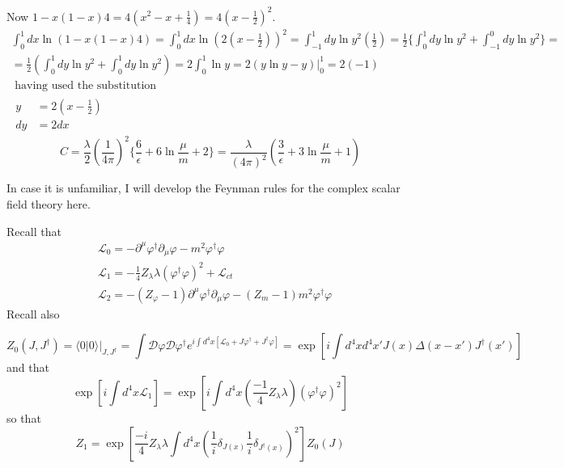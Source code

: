 \documentclass[twoside]{amsart}
\newcommand{\solutionhead}[1]
  {\smallskip
   \noindent{\large\bf Solution #1.}
   }
\begin{document}
Now $1-  x(1-x)4 = 4 (x^2 -x + \frac{1}{4} ) = 4(x-\frac{1}{2} )^2$.  
\[
\begin{gathered}
  \int_0^1 dx \ln{ (1 - x(1-x)4) } = \int_0^1 dx \ln{ ( 2 ( x- \frac{1}{2} ) )^2 } = \int_{-1}^1 dy \ln{ y^2} \left( \frac{1}{2} \right) = \frac{1}{2} \lbrace \int_0^1 dy \ln{y^2} + \int_{-1}^0 dy \ln{ y^2} \rbrace = \\ 
  = \frac{1}{2} \left( \int_0^1 dy \ln{y^2} + \int_0^1 dy \ln{y^2} \right) = 2 \int_0^1 \ln{y} = 2 \left. ( y\ln{y} - y ) \right|_0^1 = 2(-1) \\ 
  \text{ having used the substitution } \\
  \begin{aligned}
    y & = 2(x - \frac{1}{2} )  \\ 
    dy & = 2 dx
\end{aligned}
\end{gathered} 
\]
\[
C = \frac{ \lambda}{2} \left( \frac{1}{4\pi } \right)^2 \lbrace \frac{ 6}{\epsilon} + 6\ln{ \frac{ \mu}{m }} + 2 \rbrace  = \boxed{ \frac{ \lambda}{ ( 4\pi)^2} \left( \frac{3}{\epsilon} + 3 \ln{ \frac{ \mu}{ m}} + 1 \right)} 
\]

\solutionhead{16.2} 
In case it is unfamiliar, I will develop the Feynman rules for the complex scalar field theory here.  

Recall that 
\[
\begin{aligned}
  & \mathcal{L}_0 = - \partial^{\mu} \varphi^{\dag} \partial_{\mu} \varphi - m^2 \varphi^{\dag} \varphi \\  
  & \mathcal{L}_1 = -\frac{1}{4} Z_{\lambda} \lambda ( \varphi^{\dag} \varphi )^2 + \mathcal{L}_{ct} \\ 
  & \mathcal{L}_2 = - (Z_{ \varphi} - 1) \partial^{\mu} \varphi^{\dag} \partial_{\mu} \varphi - (Z_m - 1) m^2 \varphi^{\dag} \varphi
\end{aligned}
\]
Recall also 

\[
Z_0(J,J^{\dag}) = \left. \langle 0 | 0 \rangle \right|_{J,J^{\dag}} = \int \mathcal{D}\varphi \mathcal{D} \varphi^{\dag} e^{ i \int d^4x [ \mathcal{L}_0 + J \varphi^{\dag} + J^{\dag} \varphi ] } = \exp{ \left[ i \int d^4x d^4x' J(x) \Delta(x-x') J^{\dag}(x') \right] }
\]
and that 
\[
\exp{ \left[ i \int d^4x \mathcal{L}_1 \right]} = \exp{ \left[ i \int d^4x \left( \frac{-1}{4} Z_{\lambda} \lambda \right)( \varphi^{\dag} \varphi)^2 \right] }
\]
so that 
\[
Z_1 = \exp{ \left[ \frac{ -i}{4} Z_{\lambda} \lambda \int d^4x \left( \frac{1}{i} \delta_{J(x)} \frac{1}{i} \delta_{J^{\dag}(x)} \right)^2 \right]}Z_0(J)
\]
\end{document}
